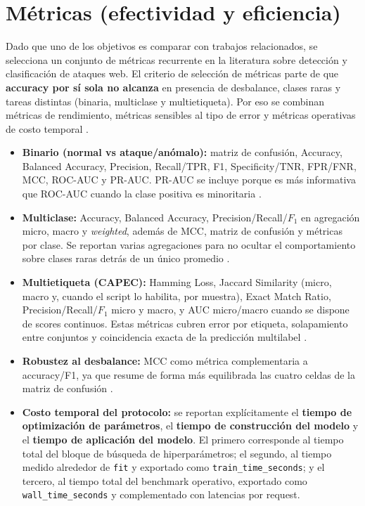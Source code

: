 \documentclass[12pt,oneside]{report}
\begin{document}
\section{Métricas (efectividad y eficiencia)}
Dado que uno de los objetivos es comparar con trabajos relacionados, se selecciona un conjunto de métricas recurrente en la literatura sobre detección y clasificación de ataques web. El criterio de selección de métricas parte de que \textbf{accuracy por sí sola no alcanza} en presencia de desbalance, clases raras y tareas distintas (binaria, multiclase y multietiqueta). Por eso se combinan métricas de rendimiento, métricas sensibles al tipo de error y métricas operativas de costo temporal \cite{saito_pr_auc,chicco_mcc,srbh_paper,tsoumakas_multilabel_overview}.

\begin{itemize}[leftmargin=*]
  \item \textbf{Binario (normal vs ataque/anómalo):} matriz de confusión, Accuracy, Balanced Accuracy, Precision, Recall/TPR, F1, Specificity/TNR, FPR/FNR, MCC, ROC-AUC y PR-AUC. PR-AUC se incluye porque es más informativa que ROC-AUC cuando la clase positiva es minoritaria \cite{saito_pr_auc}.
  \item \textbf{Multiclase:} Accuracy, Balanced Accuracy, Precision/Recall/$F_1$ en agregación micro, macro y \textit{weighted}, además de MCC, matriz de confusión y métricas por clase. Se reportan varias agregaciones para no ocultar el comportamiento sobre clases raras detrás de un único promedio \cite{tsoumakas_multilabel_overview,zhou_2024}.
  \item \textbf{Multietiqueta (CAPEC):} Hamming Loss, Jaccard Similarity (micro, macro y, cuando el script lo habilita, por muestra), Exact Match Ratio, Precision/Recall/$F_1$ micro y macro, y AUC micro/macro cuando se dispone de scores continuos. Estas métricas cubren error por etiqueta, solapamiento entre conjuntos y coincidencia exacta de la predicción multilabel \cite{srbh_paper,tsoumakas_multilabel_overview}.
  \item \textbf{Robustez al desbalance:} MCC como métrica complementaria a accuracy/F1, ya que resume de forma más equilibrada las cuatro celdas de la matriz de confusión \cite{chicco_mcc}.
  \item \textbf{Costo temporal del protocolo:} se reportan explícitamente el \textbf{tiempo de optimización de parámetros}, el \textbf{tiempo de construcción del modelo} y el \textbf{tiempo de aplicación del modelo}. El primero corresponde al tiempo total del bloque de búsqueda de hiperparámetros; el segundo, al tiempo medido alrededor de \texttt{fit} y exportado como \texttt{train\_time\_seconds}; y el tercero, al tiempo total del benchmark operativo, exportado como \texttt{wall\_time\_seconds} y complementado con latencias por request.

\end{itemize}
\end{document}
